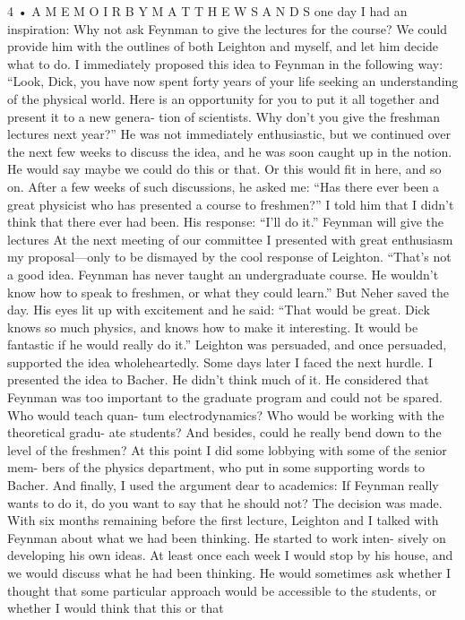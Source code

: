 \documentclass[10pt,oneside]{article}
\begin{document}
4 • A  M E M O I R  B Y  M A T T H E W  S A N D S one day I had an inspiration: Why not ask Feynman to give the lectures for the course? We could provide him with the outlines of both Leighton and myself, and let him decide what to do. I immediately proposed this idea to Feynman in the following way: “Look, Dick, you have now spent forty years of your life seeking an understanding of the physical world. Here is an opportunity for you to put it all together and present it to a new genera- tion of scientists. Why don’t you give the freshman lectures next year?” He was not immediately enthusiastic, but we continued over the next few weeks to discuss the idea, and he was soon caught up in the notion. He would say maybe we could do this or that. Or this would fit in here, and so on. After a few weeks of such discussions, he asked me: “Has there ever been a great physicist who has presented a course to freshmen?” I told him that I didn’t think that there ever had been. His response: “I’ll do it.” Feynman will give the lectures At the next meeting of our committee I presented with great enthusiasm my proposal---only to be dismayed by the cool response of Leighton. “That’s not a good idea. Feynman has never taught an undergraduate course. He wouldn’t know how to speak to freshmen, or what they could learn.” But Neher saved the day. His eyes lit up with excitement and he said: “That would be great. Dick knows so much physics, and knows how to make it interesting. It would be fantastic if he would really do it.” Leighton was persuaded, and once persuaded, supported the idea wholeheartedly. Some days later I faced the next hurdle. I presented the idea to Bacher. He didn’t think much of it. He considered that Feynman was too important to the graduate program and could not be spared. Who would teach quan- tum electrodynamics? Who would be working with the theoretical gradu- ate students? And besides, could he really bend down to the level of the freshmen? At this point I did some lobbying with some of the senior mem- bers of the physics department, who put in some supporting words to Bacher. And finally, I used the argument dear to academics: If Feynman really wants to do it, do you want to say that he should not? The decision was made. With six months remaining before the first lecture, Leighton and I talked with Feynman about what we had been thinking. He started to work inten- sively on developing his own ideas. At least once each week I would stop by his house, and we would discuss what he had been thinking. He would sometimes ask whether I thought that some particular approach would be accessible to the students, or whether I would think that this or that\par
\end{document}
